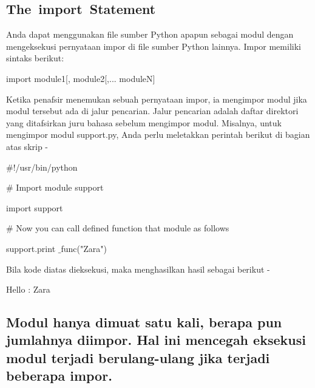 \documentclass[a4paper,12pt]{report}
\begin{document}
\subsection*{The import Statement}
 \par
\begin{adjustwidth}{0.03in}{0.03in}
Anda dapat menggunakan file sumber Python apapun sebagai modul dengan mengeksekusi pernyataan impor di file sumber Python lainnya. Impor memiliki sintaks berikut:\end{adjustwidth}
 \par
\noindent 
 \hspace*{0.5in} import module1[, module2[,... moduleN] \par
\begin{adjustwidth}{0.03in}{0.03in}
Ketika penafsir menemukan sebuah pernyataan impor, ia mengimpor modul jika modul tersebut ada di jalur pencarian. Jalur pencarian adalah daftar direktori yang ditafsirkan juru bahasa sebelum mengimpor modul. Misalnya, untuk mengimpor modul support.py, Anda perlu meletakkan perintah berikut di bagian atas skrip -\end{adjustwidth}
 \par
\noindent 
 \hspace*{0.5in}  $  \#  $!/usr/bin/python \par
\vspace{12pt}
\noindent 
 \hspace*{0.5in}  $  \#  $ Import module support \par
\noindent 
 \hspace*{0.5in} import support \par
\vspace{12pt}
\noindent 
 \hspace*{0.5in}  $  \#  $ Now you can call defined function that module as follows \par
\noindent 
 \hspace*{0.5in} support.print $  \_  $func("Zara") \par
\begin{adjustwidth}{0.03in}{0.03in}
Bila kode diatas dieksekusi, maka menghasilkan hasil sebagai berikut -\end{adjustwidth}
 \par
\noindent 
 \hspace*{0.5in} Hello : Zara \par
\subsection*{Modul hanya dimuat satu kali, berapa pun jumlahnya diimpor. Hal ini mencegah eksekusi modul terjadi berulang-ulang jika terjadi beberapa impor.}
 \par
\vspace{12pt}
\end{document}
